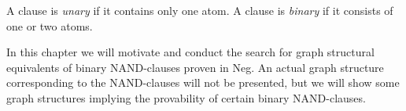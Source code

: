 \begin{definition}
  A clause is \textit{unary} if it contains only one atom.
  A clause is \textit{binary} if it consists of one or two atoms.
\end{definition}
In this chapter we will motivate and conduct the search for graph structural equivalents of binary NAND-clauses proven in Neg.
An actual graph structure corresponding to the NAND-clauses will not be presented, but we will show some graph structures implying the provability of certain binary NAND-clauses.
